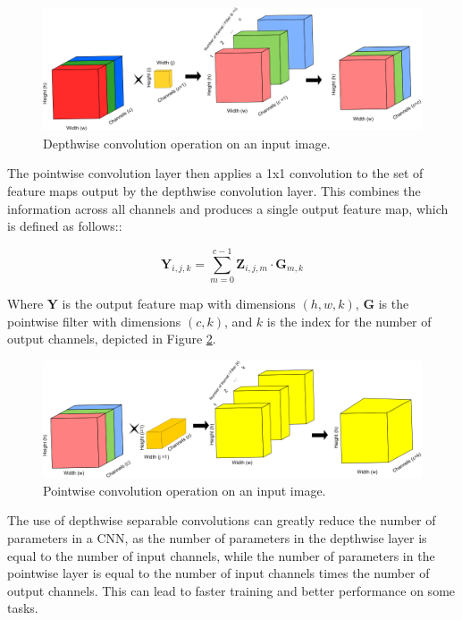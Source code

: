 \begin{figure}[htbp]
   \begin{center}
      \includegraphics[width=1\linewidth]{Chapitre1/figures/Depthwise.png}
   \end{center}
   \caption{ Depthwise convolution operation on an input image.}
   \label{fig:Depthwise}
\end{figure}


The pointwise convolution layer then applies a 1x1 convolution to the set of feature maps output by the depthwise convolution layer. This combines the information across all channels and produces a single output feature map, which is defined as follows::

\begin{equation}
\mathbf{Y}_{i,j,k} = \sum_{m=0}^{c-1} \mathbf{Z}_{i,j,m} \cdot \mathbf{G}_{m,k}
\end{equation}

Where $\mathbf{Y}$ is the output feature map with dimensions $(h, w, k)$, $\mathbf{G}$ is the pointwise filter with dimensions $(c, k)$, and $k$ is the index for the number of output channels, depicted in Figure \ref{fig:Separable}.


\begin{figure}[htbp]
   \begin{center}
      \includegraphics[width=1\linewidth]{Chapitre1/figures/Separable.png}
   \end{center}
   \caption{ Pointwise convolution operation on an input image.}
   \label{fig:Separable}
\end{figure}


The use of depthwise separable convolutions can greatly reduce the number of parameters in a CNN, as the number of parameters in the depthwise layer is equal to the number of input channels, while the number of parameters in the pointwise layer is equal to the number of input channels times the number of output channels. This can lead to faster training and better performance on some tasks.







